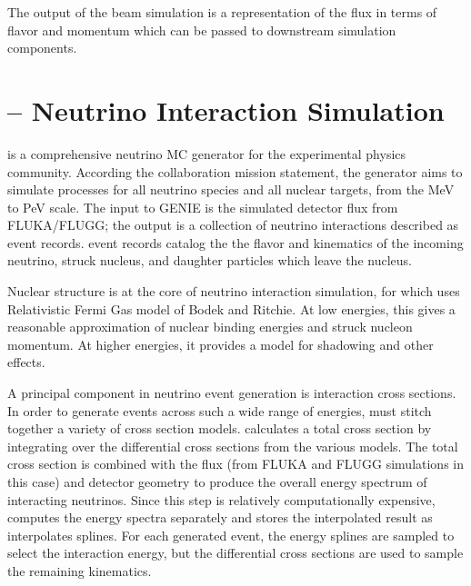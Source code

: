 The output of the beam simulation is a representation of the \numi flux
in terms of flavor and momentum which can be passed to downstream simulation
components.


\section{\genie -- Neutrino Interaction Simulation}
\label{genie_section}

\genie is a comprehensive neutrino MC generator for the experimental physics community.  According the \genie collaboration mission statement, the generator aims to simulate processes  for all neutrino species and all nuclear targets, from the MeV to PeV scale.  The input to GENIE is the simulated detector flux from FLUKA/FLUGG; the output is a collection of neutrino interactions described as \genie event records.  \genie event records catalog the the flavor and kinematics of the incoming neutrino, struck nucleus, and daughter particles which leave the nucleus.

Nuclear structure is at the core of neutrino interaction simulation, for which \genie uses  Relativistic Fermi Gas model of Bodek and Ritchie.  \cite{bodekritchie}  At low energies, this gives a reasonable approximation of nuclear binding energies and struck nucleon momentum.  At higher energies, it provides a model for shadowing and other effects.

A principal component in neutrino event generation is interaction cross sections.  In order to generate events across such a wide range of energies, \genie must stitch together a variety of cross section models.  \genie calculates a total cross section by integrating over the differential cross sections from the various models.  The total cross section is combined with the flux (from FLUKA and FLUGG simulations in this case) and detector geometry to produce the overall energy spectrum of interacting neutrinos.  Since this step is relatively computationally expensive, \genie computes the energy spectra separately and stores the interpolated result as interpolates splines.  For each generated event, the energy splines are sampled to select the interaction energy, but the differential cross sections are used to sample the remaining kinematics.




